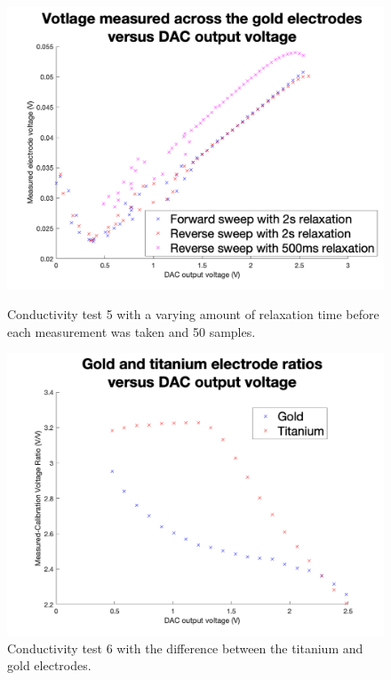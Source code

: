 \begin{figure}[ht]
    \begin{minipage}{0.5\textwidth}
        \centering
        \includegraphics[width=\textwidth]{Figures/Testing/Aus8}
        \caption{Conductivity test 5 with a varying amount of relaxation time before each measurement was taken and 50 samples.}
        \label{fig:test5} %
        \end{minipage}
    \begin{minipage}{0.5\textwidth}
        \centering
        \includegraphics[width=\textwidth]{Figures/Testing/AusTi15}
        \caption{Conductivity test 6 with the difference between the titanium and gold electrodes.}
        \label{fig:test6} %
    \end{minipage}
\end{figure}

